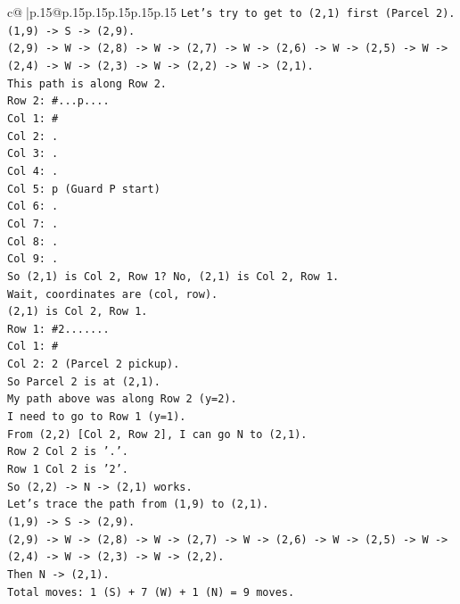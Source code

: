 \documentclass{article}
\begin{document}
{\begin{supertabular}{c@{$\;$}|p{.15\linewidth}@{}p{.15\linewidth}p{.15\linewidth}p{.15\linewidth}p{.15\linewidth}p{.15\linewidth}}
{{{\texttt{Let's try to get to (2,1) first (Parcel 2).} \\
\texttt{(1,9) {-}> S {-}> (2,9).} \\
\texttt{(2,9) {-}> W {-}> (2,8) {-}> W {-}> (2,7) {-}> W {-}> (2,6) {-}> W {-}> (2,5) {-}> W {-}> (2,4) {-}> W {-}> (2,3) {-}> W {-}> (2,2) {-}> W {-}> (2,1).} \\
\texttt{This path is along Row 2.} \\
\texttt{Row 2: \#...p....} \\
\texttt{Col 1: \#} \\
\texttt{Col 2: .} \\
\texttt{Col 3: .} \\
\texttt{Col 4: .} \\
\texttt{Col 5: p (Guard P start)} \\
\texttt{Col 6: .} \\
\texttt{Col 7: .} \\
\texttt{Col 8: .} \\
\texttt{Col 9: .} \\
\texttt{So (2,1) is Col 2, Row 1? No, (2,1) is Col 2, Row 1.} \\
\texttt{Wait, coordinates are (col, row).} \\
\texttt{(2,1) is Col 2, Row 1.} \\
\texttt{Row 1: \#2.......} \\
\texttt{Col 1: \#} \\
\texttt{Col 2: 2 (Parcel 2 pickup).} \\
\texttt{So Parcel 2 is at (2,1).} \\
\texttt{My path above was along Row 2 (y=2).} \\
\texttt{I need to go to Row 1 (y=1).} \\
\texttt{From (2,2) {[}Col 2, Row 2{]}, I can go N to (2,1).} \\
\texttt{Row 2 Col 2 is '.'.} \\
\texttt{Row 1 Col 2 is '2'.} \\
\texttt{So (2,2) {-}> N {-}> (2,1) works.} \\
\texttt{Let's trace the path from (1,9) to (2,1).} \\
\texttt{(1,9) {-}> S {-}> (2,9).} \\
\texttt{(2,9) {-}> W {-}> (2,8) {-}> W {-}> (2,7) {-}> W {-}> (2,6) {-}> W {-}> (2,5) {-}> W {-}> (2,4) {-}> W {-}> (2,3) {-}> W {-}> (2,2).} \\
\texttt{Then N {-}> (2,1).} \\
\texttt{Total moves: 1 (S) + 7 (W) + 1 (N) = 9 moves.} \\
}}}
\end{supertabular}}
\end{document}

